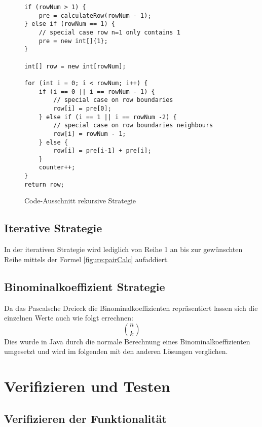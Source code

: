 \documentclass[11pt]{scrartcl}
\begin{document}
		\begin{figure}
		\begin{verbatim}
if (rowNum > 1) {
    pre = calculateRow(rowNum - 1);
} else if (rowNum == 1) {
    // special case row n=1 only contains 1
    pre = new int[]{1};		
}

int[] row = new int[rowNum];
        
for (int i = 0; i < rowNum; i++) {
    if (i == 0 || i == rowNum - 1) {	
        // special case on row boundaries
        row[i] = pre[0];
    } else if (i == 1 || i == rowNum -2) {
        // special case on row boundaries neighbours
        row[i] = rowNum - 1;
    } else {
        row[i] = pre[i-1] + pre[i];
    }
    counter++;
}
return row;
		\end{verbatim}
		\caption{Code-Ausschnitt rekursive Strategie}
		\label{figure:recCode}
		\end{figure}
	
	\subsection{Iterative Strategie}
		\label{sec:iterStrat}
		
		In der iterativen Strategie wird lediglich von Reihe 1 an bis zur gewünschten Reihe mittels der Formel \ref{figure:pairCalc} aufaddiert.
	
	\subsection{Binominalkoeffizient Strategie}
		\label{sec:binoStrat}
		
		Da das Pascalsche Dreieck die Binominalkoeffizienten repräsentiert lassen sich die einzelnen Werte auch wie folgt errechnen:
		\begin{equation*}
		\binom{n}{k}
		\end{equation*}
		Dies wurde in Java durch die normale Berechnung eines Binominalkoeffizienten umgesetzt und wird im folgenden mit den anderen Lösungen verglichen.

\section{Verifizieren und Testen}
\label{sec:vertests}

	\subsection{Verifizieren der Funktionalität}
		\label{sec:verfun}
		
\end{document}

